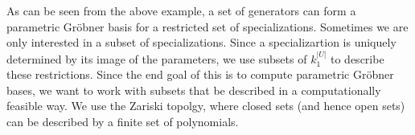\documentclass[a4paper, 12pt]{article}
\newcommand{\C}{\mathbb{C}}
\theoremstyle{changedot}
\theoremstyle{changedotbreak}
\theoremstyle{nonumberplain}
\begin{document}







As can be seen from the above example, a set of generators can form a parametric Gröbner basis for a restricted set of specializations. Sometimes we are only interested in a subset of specializations. Since a specializartion is uniquely determined by its image of the parameters, we use subsets of $k_{1}^{|U|}$ to describe these restrictions. Since the end goal of this is to compute parametric Gröbner bases, we want to work with subsets that be described in a computationally feasible way. We use the Zariski topolgy, where closed sets (and hence open sets) can be described by a finite set of polynomials.
\end{document}
